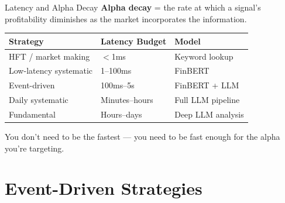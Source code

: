 \documentclass[aspectratio=169]{beamer}
\begin{document}
\begin{frame}{Latency and Alpha Decay}
\textbf{Alpha decay} = the rate at which a signal's profitability diminishes as the market incorporates the information.
\vspace{0.3cm}
\begin{center}
\small
\begin{tabular}{@{} l l l @{}}
\toprule
\textbf{Strategy} & \textbf{Latency Budget} & \textbf{Model} \\
\midrule
HFT / market making & $<$1ms & Keyword lookup \\
Low-latency systematic & 1--100ms & FinBERT \\
Event-driven & 100ms--5s & FinBERT + LLM \\
Daily systematic & Minutes--hours & Full LLM pipeline \\
Fundamental & Hours--days & Deep LLM analysis \\
\bottomrule
\end{tabular}
\end{center}
\vspace{0.3cm}
You don't need to be the fastest --- you need to be \alert{fast enough for the alpha you're targeting}.
\end{frame}

\section{Event-Driven Strategies}
\end{document}
